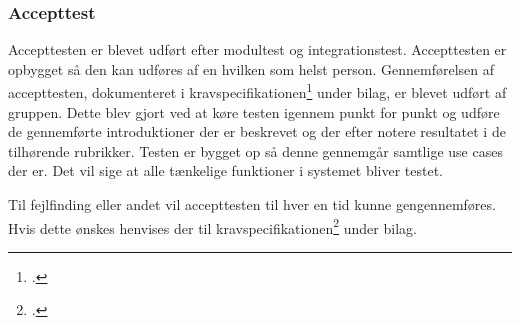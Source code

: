 \subsubsection{Accepttest}
Accepttesten er blevet udført efter modultest og integrationstest. Accepttesten er opbygget så den kan udføres af en hvilken som helst person. Gennemførelsen af accepttesten, dokumenteret i kravspecifikationen\footcite{documentation} under bilag, er blevet udført af gruppen. Dette blev gjort ved at køre testen igennem punkt for punkt og udføre de gennemførte introduktioner der er beskrevet og der efter notere resultatet i de tilhørende rubrikker. Testen er bygget op så denne gennemgår samtlige use cases der er. Det vil sige at alle tænkelige funktioner i systemet bliver testet.

Til fejlfinding eller andet vil accepttesten til hver en tid kunne gengennemføres. Hvis dette ønskes henvises der til kravspecifikationen\footcite{documentation} under bilag.   
